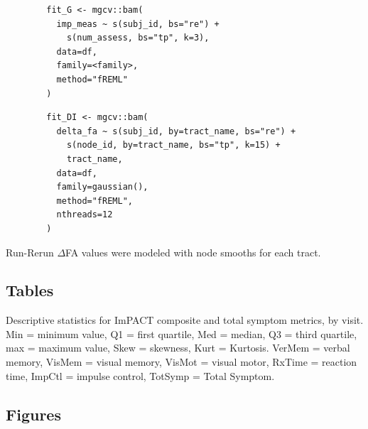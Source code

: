 \documentclass[12pt]{article}
\begin{document}
\begin{equ}[H]
	\begin{lstlisting}
		fit_G <- mgcv::bam(
		  imp_meas ~ s(subj_id, bs="re") +
		    s(num_assess, bs="tp", k=3),
		  data=df,
		  family=<family>,
		  method="fREML"
		)
	\end{lstlisting}
	\caption{ImPACT metrics modeled as a function of number of assessments using a single global smooth. \lstinline{imp_meas} = ImPACT composite or total symptom score, \lstinline{num_assess} = assessment number (1=Base, 2=Post, 3=RTP).}
	\label{supp-code:gam-impact}
\end{equ}


\begin{equ}[H]
	\begin{lstlisting}
		fit_DI <- mgcv::bam(
		  delta_fa ~ s(subj_id, by=tract_name, bs="re") +
		    s(node_id, by=tract_name, bs="tp", k=15) +
		    tract_name,
		  data=df,
		  family=gaussian(),
		  method="fREML",
		  nthreads=12
		)
	\end{lstlisting}
	\caption{Run-Rerun $\Delta$FA values were modeled with node smooths for each tract.}
	\label{supp-code:gam-di}
\end{equ}


\subsection{Tables}
\label{ssec:supp-tables}
\begin{table}[H]
	\scriptsize
	
	\caption{Descriptive statistics for ImPACT composite and total symptom metrics, by visit. Min = minimum value, Q1 = first quartile, Med = median, Q3 = third quartile, max = maximum value, Skew = skewness, Kurt = Kurtosis. VerMem = verbal memory, VisMem = visual memory, VisMot = visual motor, RxTime = reaction time, ImpCtl = impulse control, TotSymp = Total Symptom.}
	\label{supp-tbl:imp-desc}
\end{table}


\subsection{Figures}
\label{ssec:supp-figures}
\end{document}
